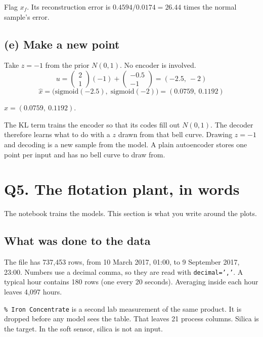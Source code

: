 \documentclass[11pt,a4paper]{article}
\begin{document}
\begin{answer}[Q4(d)]
Flag \(x_f\). Its reconstruction error is \(0.4594/0.0174=26.44\) times the normal sample's error.
\end{answer}

\subsection{(e) Make a new point}

Take \(z=-1\) from the prior \(N(0,1)\). No encoder is involved.
\[
u=\begin{pmatrix}2\\1\end{pmatrix}(-1)+\begin{pmatrix}-0.5\\-1\end{pmatrix}=(-2.5,\ -2)
\]
\[
\hat x=\big(\mathrm{sigmoid}(-2.5),\;\mathrm{sigmoid}(-2)\big)=(0.0759,\ 0.1192)
\]

\begin{answer}[Q4(e)]
\(\hat x=(0.0759,\ 0.1192)\).

The KL term trains the encoder so that its codes fill out \(N(0,1)\). The decoder therefore learns what to do with a \(z\) drawn from that bell curve. Drawing \(z=-1\) and decoding is a new sample from the model. A plain autoencoder stores one point per input and has no bell curve to draw from.
\end{answer}

\section{Q5. The flotation plant, in words}

The notebook trains the models. This section is what you write around the plots.

\subsection{What was done to the data}

The file has 737{,}453 rows, from 10 March 2017, 01:00, to 9 September 2017, 23:00. Numbers use a decimal comma, so they are read with \texttt{decimal=','}. A typical hour contains 180 rows (one every 20 seconds). Averaging inside each hour leaves 4{,}097 hours.

\texttt{\% Iron Concentrate} is a second lab measurement of the same product. It is dropped before any model sees the table. That leaves 21 process columns. Silica is the target. In the soft sensor, silica is not an input.
\end{document}

